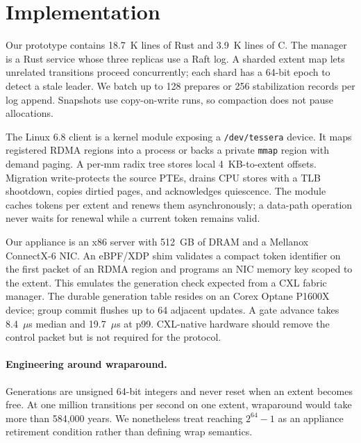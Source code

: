 \section{Implementation}
\label{sec:implementation}

Our prototype contains 18.7~K lines of Rust and 3.9~K lines of C. The manager is
a Rust service whose three replicas use a Raft log. A sharded extent map lets
unrelated transitions proceed concurrently; each shard has a 64-bit epoch to
detect a stale leader. We batch up to 128 prepares or 256 stabilization records
per log append. Snapshots use copy-on-write runs, so compaction does not pause
allocations.

The Linux 6.8 client is a kernel module exposing a \texttt{/dev/tessera}
device. It maps registered RDMA regions into a process or backs a private
\texttt{mmap} region with demand paging. A per-mm radix tree stores local
4~KB-to-extent offsets. Migration write-protects the source PTEs, drains CPU
stores with a TLB shootdown, copies dirtied pages, and acknowledges quiescence.
The module caches tokens per extent and renews them asynchronously; a data-path
operation never waits for renewal while a current token remains valid.

Our appliance is an x86 server with 512~GB of DRAM and a Mellanox ConnectX-6
NIC. An eBPF/XDP shim validates a compact token identifier on the first packet
of an RDMA region and programs an NIC memory key scoped to the extent. This
emulates the generation check expected from a CXL fabric manager. The durable
generation table resides on an Corex Optane P1600X device; group commit flushes
up to 64 adjacent updates. A gate advance takes 8.4~$\mu$s median and
19.7~$\mu$s at p99. CXL-native hardware should remove the control packet but is
not required for the protocol.

\paragraph{Engineering around wraparound.}
Generations are unsigned 64-bit integers and never reset when an extent becomes
free. At one million transitions per second on one extent, wraparound would
take more than 584,000 years. We nonetheless treat reaching $2^{64}-1$ as an
appliance retirement condition rather than defining wrap semantics.
